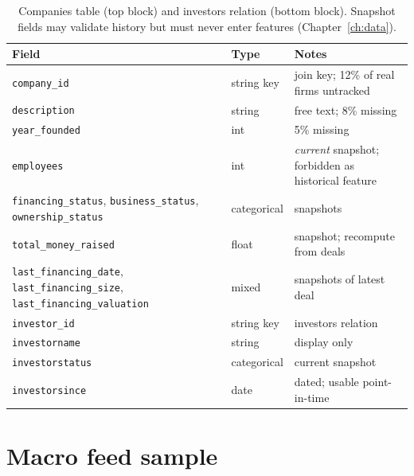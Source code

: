 \begin{table}[htbp]
\centering
\footnotesize
\begin{tabular}{llp{5.4cm}}
\toprule
Field & Type & Notes \\
\midrule
\texttt{company\_id} & string key & join key; 12\% of real firms untracked \\
\texttt{description} & string & free text; 8\% missing \\
\texttt{year\_founded} & int & 5\% missing \\
\texttt{employees} & int & \emph{current} snapshot; forbidden as historical feature \\
\texttt{financing\_status}, \texttt{business\_status}, \texttt{ownership\_status} & categorical & snapshots \\
\texttt{total\_money\_raised} & float & snapshot; recompute from deals \\
\texttt{last\_financing\_date}, \texttt{last\_financing\_size}, \texttt{last\_financing\_valuation} & mixed & snapshots of latest deal \\
\midrule
\texttt{investor\_id} & string key & investors relation \\
\texttt{investorname} & string & display only \\
\texttt{investorstatus} & categorical & current snapshot \\
\texttt{investorsince} & date & dated; usable point-in-time \\
\bottomrule
\end{tabular}
\caption{Companies table (top block) and investors relation (bottom block). Snapshot fields may validate
history but must never enter features (Chapter~\ref{ch:data}).}
\label{tab:app-companies}
\end{table}

\section{Macro feed sample}\label{app:schema-macro}

